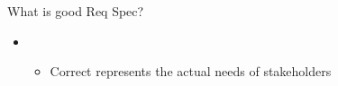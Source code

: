 
\begin{Slide}{What is good Req Spec?}

\begin{itemize}
\item \TODO{}
\begin{itemize}
\item Correct \hfill represents the actual needs of stakeholders

\end{itemize}
\end{itemize}
\end{Slide}